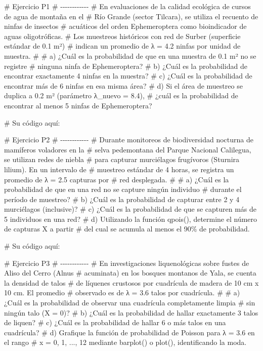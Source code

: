 \documentclass[
  spanish,
  letterpaper,
  DIV=11,
  numbers=noendperiod]{scrreprt}
\newenvironment{Shaded}{\begin{snugshade}}{\end{snugshade}}
\newcommand{\CommentTok}[1]{\textcolor[rgb]{0.37,0.37,0.37}{#1}}
\begin{document}
\begin{Shaded}
\begin{Highlighting}[]
\CommentTok{\# Ejercicio P1}
\CommentTok{\# {-}{-}{-}{-}{-}{-}{-}{-}{-}{-}{-}{-}}
\CommentTok{\# En evaluaciones de la calidad ecológica de cursos de agua de montaña en el}
\CommentTok{\# Río Grande (sector Tilcara), se utiliza el recuento de ninfas de insectos}
\CommentTok{\# acuáticos del orden Ephemeroptera como bioindicador de aguas oligotróficas.}
\CommentTok{\# Los muestreos históricos con red de Surber (superficie estándar de 0.1 m²)}
\CommentTok{\# indican un promedio de λ = 4.2 ninfas por unidad de muestra.}
\CommentTok{\#}
\CommentTok{\# a) ¿Cuál es la probabilidad de que en una muestra de 0.1 m² no se registre}
\CommentTok{\#    ninguna ninfa de Ephemeroptera?}
\CommentTok{\# b) ¿Cuál es la probabilidad de encontrar exactamente 4 ninfas en la muestra?}
\CommentTok{\# c) ¿Cuál es la probabilidad de encontrar más de 6 ninfas en esa misma área?}
\CommentTok{\# d) Si el área de muestreo se duplica a 0.2 m² (parámetro λ\_nuevo = 8.4),}
\CommentTok{\#    ¿cuál es la probabilidad de encontrar al menos 5 ninfas de Ephemeroptera?}

\CommentTok{\# Su código aquí:}


\CommentTok{\# Ejercicio P2}
\CommentTok{\# {-}{-}{-}{-}{-}{-}{-}{-}{-}{-}{-}{-}}
\CommentTok{\# Durante monitoreos de biodiversidad nocturna de mamíferos voladores en la}
\CommentTok{\# selva pedemontana del Parque Nacional Calilegua, se utilizan redes de niebla}
\CommentTok{\# para capturar murciélagos frugívoros (Sturnira lilium). En un intervalo de}
\CommentTok{\# muestreo estándar de 4 horas, se registra un promedio de λ = 2.5 capturas por}
\CommentTok{\# red desplegada.}
\CommentTok{\#}
\CommentTok{\# a) ¿Cuál es la probabilidad de que en una red no se capture ningún individuo}
\CommentTok{\#    durante el período de muestreo?}
\CommentTok{\# b) ¿Cuál es la probabilidad de capturar entre 2 y 4 murciélagos (inclusive)?}
\CommentTok{\# c) ¿Cuál es la probabilidad de que se capturen más de 5 individuos en una red?}
\CommentTok{\# d) Utilizando la función qpois(), determine el número de capturas X a partir}
\CommentTok{\#    del cual se acumula al menos el 90\% de probabilidad.}

\CommentTok{\# Su código aquí:}


\CommentTok{\# Ejercicio P3}
\CommentTok{\# {-}{-}{-}{-}{-}{-}{-}{-}{-}{-}{-}{-}}
\CommentTok{\# En investigaciones liquenológicas sobre fustes de Aliso del Cerro (Alnus}
\CommentTok{\# acuminata) en los bosques montanos de Yala, se cuenta la densidad de talos}
\CommentTok{\# de líquenes crustosos por cuadrícula de madera de 10 cm x 10 cm. El promedio}
\CommentTok{\# observado es de λ = 3.6 talos por cuadrícula.}
\CommentTok{\#}
\CommentTok{\# a) ¿Cuál es la probabilidad de observar una cuadrícula completamente limpia}
\CommentTok{\#    sin ningún talo (X = 0)?}
\CommentTok{\# b) ¿Cuál es la probabilidad de hallar exactamente 3 talos de liquen?}
\CommentTok{\# c) ¿Cuál es la probabilidad de hallar 6 o más talos en una cuadrícula?}
\CommentTok{\# d) Grafique la función de probabilidad de Poisson para λ = 3.6 en el rango}
\CommentTok{\#    x = 0, 1, ..., 12 mediante barplot() o plot(), identificando la moda.}


\end{Highlighting}
\end{Shaded}
\end{document}
